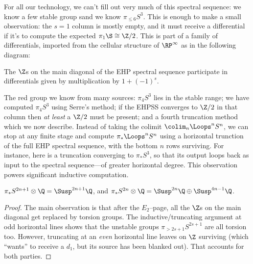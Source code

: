 For all our technology, we can't fill out very much of this spectral sequence: we know a few stable group sand we know $\pi_{\le 6} S^3$.  This is enough to make a small observation: the $s = 1$ column is mostly empty, and it must receive a differential if it's to compute the expected $\pi_1 \S \cong \Z/2$.  This is part of a family of differentials, imported from the cellular structure of $\RP^\infty$ as in the following diagram:
\begin{center}
\end{center}
The $\Z$s on the main diagonal of the EHP spectral sequence participate in differentials given by multiplication by $1 + (-1)^s$.

The red group we know from many sources: $\pi_4 S^3$ lies in the stable range; we have computed $\pi_4 S^3$ using Serre's method; if the EHPSS converges to $\Z/2$ in that column then \emph{at least} a $\Z/2$ must be present; and a fourth truncation method which we now describe.  Instead of taking the colimit $\colim_n \Loops^n S^n$, we can stop at any finite stage and compute $\pi_* \Loops^n S^n$ using a horizontal trunction of the full EHP spectral sequence, with the bottom $n$ rows surviving.  For instance, here is a truncation converging to $\pi_* S^3$, so that its output loops back as input to the spectral sequence---of greater horizontal degree.  This observation powers significant inductive computation.

\begin{corollary}
$\pi_* S^{2n+1} \otimes \Q = \Susp^{2n+1} \Q$, and $\pi_* S^{2n} \otimes \Q = \Susp^{2n} \Q \oplus \Susp^{4n-1} \Q$.
\end{corollary}
\begin{proof}
The main observation is that after the $E_2$--page, all the $\Z$s on the main diagonal get replaced by torsion groups.  The inductive/truncating argument at odd horizontal lines shows that the unstable groups $\pi_{> 2s+1} S^{2s+1}$ are all torsion too.  However, truncating at an \emph{even} horizontal line leaves on $\Z$ surviving (which ``wants'' to receive a $d_1$, but its source has been blanked out).  That accounts for both parties. 
\end{proof}






